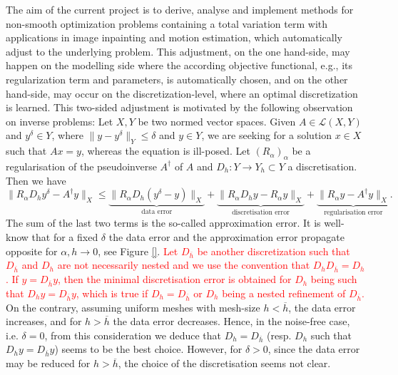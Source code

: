 \documentclass[enabledeprecatedfontcommands,cleardoublepage=empty,headsepline,twoside,11pt,DIV=15,BCOR=12mm,final]{scrartcl}
\newcommand{\nnew}[1]{{\textcolor{red}{#1}}}
\begin{document}
The aim of the current project is to derive, analyse and implement methods for non-smooth optimization problems containing a total variation term with applications in image inpainting and motion estimation, which automatically adjust to the underlying problem. This adjustment, on the one hand-side, may happen on the modelling side where the according objective functional, e.g., its regularization term and parameters, is automatically chosen, and on the other hand-side, may occur on the discretization-level, where an optimal discretization is learned. This two-sided adjustment is motivated by the following observation on inverse problems: Let $X,Y$ be two normed vector spaces. Given $A\in \mathcal{L}(X,Y)$ and $y^\delta\in Y$, where $\|y-y^\delta\|_Y \leq \delta$ and $y\in Y$, we are seeking for a solution $x\in X$ such that $Ax=y$, whereas the equation is ill-posed. Let $(R_{\alpha})_\alpha$ be a regularisation of the pseudoinverse $A^\dagger$ of $A$ and $D_h: Y \to Y_h \subset Y$ a discretisation. Then we have 
$$
\|R_\alpha D_h y^\delta - A^{\dagger} y\|_X \leq \underbrace{\|R_\alpha D_h (y^\delta - y)\|_X}_{\text{data error}} + \underbrace{\|R_\alpha D_h y - R_\alpha y\|_X}_{\text{discretisation error}} + \underbrace{\|R_\alpha y - A^{\dagger} y \|_X}_{\text{regularisation error}}.
$$
The sum of the last two terms is the so-called approximation error. It is well-know that for a fixed $\delta$ the data error and the approximation error propagate opposite for $\alpha,h \to 0$, see Figure \ref{}. \nnew{Let $D_{\overline{h}}$ be another discretization such that $D_{\overline{h}}$ and $D_{h}$ are not necessarily nested and we use the convention that $D_hD_{\overline{h}} = D_h$. If $y = D_{\overline{h}} y$, then the minimal discretisation error is obtained for $D_h$ being such that $D_h y = D_{\overline{h}}y$, which is true if $D_h = D_{\overline{h}}$ or $D_h$ being a nested refinement of $D_{\overline{h}}$.} %
On the contrary, assuming uniform meshes with mesh-size $h<\overline{h}$, the data error increases, and for $h>\overline{h}$ the data error decreases. Hence, in the noise-free case, i.e. $\delta=0$, from this consideration we deduce that $D_h=D_{\overline{h}}$ (resp. $D_h$ such that $D_h y = D_{\overline{h}} y$) seems to be the best choice. However, for $\delta>0$, %
since the data error may be reduced for $h > \overline{h}$, the choice of the discretisation seems not clear. %
\end{document}
